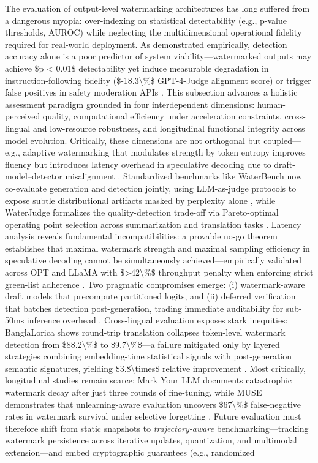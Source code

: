 \documentclass[11pt,a4paper]{article}
\begin{document}
The evaluation of output-level watermarking architectures has long suffered from a dangerous myopia: over-indexing on statistical detectability (e.g., p-value thresholds, AUROC) while neglecting the multidimensional operational fidelity required for real-world deployment. As demonstrated empirically, detection accuracy alone is a poor predictor of system viability---watermarked outputs may achieve \$p < 0.01\$ detectability yet induce measurable degradation in instruction-following fidelity (\$-18.3\textbackslash{}\%\$ GPT-4-Judge alignment score) or trigger false positives in safety moderation APIs \cite{arxiv:2402.19361,arxiv:2402.16187}. This subsection advances a holistic assessment paradigm grounded in four interdependent dimensions: human-perceived quality, computational efficiency under acceleration constraints, cross-lingual and low-resource robustness, and longitudinal functional integrity across model evolution. Critically, these dimensions are not orthogonal but coupled---e.g., adaptive watermarking that modulates strength by token entropy improves fluency but introduces latency overhead in speculative decoding due to draft-model--detector misalignment \cite{arxiv:2407.04411}. Standardized benchmarks like WaterBench now co-evaluate generation and detection jointly, using LLM-as-judge protocols to expose subtle distributional artifacts masked by perplexity alone \cite{doi:10.1145/3691626,arxiv:2502.11598}, while WaterJudge formalizes the quality-detection trade-off via Pareto-optimal operating point selection across summarization and translation tasks \cite{arxiv:2502.11598}. Latency analysis reveals fundamental incompatibilities: a provable no-go theorem establishes that maximal watermark strength and maximal sampling efficiency in speculative decoding cannot be simultaneously achieved---empirically validated across OPT and LLaMA with \$>42\textbackslash{}\%\$ throughput penalty when enforcing strict green-list adherence \cite{arxiv:2307.15593,arxiv:2403.04808}. Two pragmatic compromises emerge: (i) watermark-aware draft models that precompute partitioned logits, and (ii) deferred verification that batches detection post-generation, trading immediate auditability for sub-50ms inference overhead \cite{arxiv:2403.04808,arxiv:2307.15593}. Cross-lingual evaluation exposes stark inequities: BanglaLorica shows round-trip translation collapses token-level watermark detection from \$88.2\textbackslash{}\%\$ to \$9.7\textbackslash{}\%\$---a failure mitigated only by layered strategies combining embedding-time statistical signals with post-generation semantic signatures, yielding \$3.8\textbackslash{}times\$ relative improvement \cite{arxiv:2402.14007}. Most critically, longitudinal studies remain scarce: Mark Your LLM documents catastrophic watermark decay after just three rounds of fine-tuning, while MUSE demonstrates that unlearning-aware evaluation uncovers \$67\textbackslash{}\%\$ false-negative rates in watermark survival under selective forgetting \cite{doi:10.1145/3639477.3639720,doi:10.1609/aaai.v39i1.32018}. Future evaluation must therefore shift from static snapshots to \emph{trajectory-aware} benchmarking---tracking watermark persistence across iterative updates, quantization, and multimodal extension---and embed cryptographic guarantees (e.g., randomized 
\end{document}
